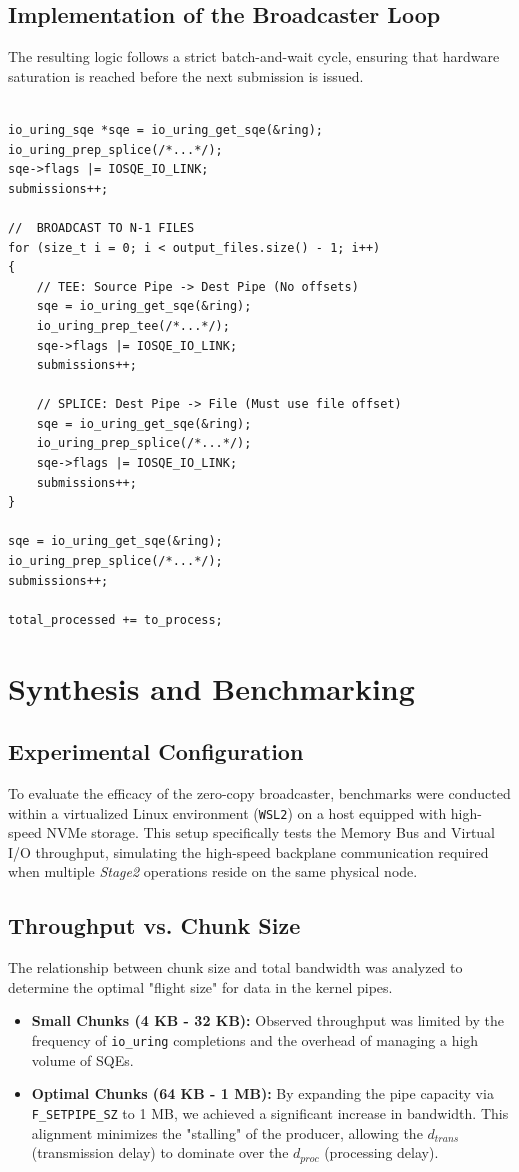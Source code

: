 \documentclass[
	a4paper,
	10pt,
	unnumberedsections,
	twoside, 
]{LTJournalArticle}
\begin{document}
\subsection{Implementation of the Broadcaster Loop}
The resulting logic follows a strict batch-and-wait cycle, ensuring that hardware saturation is reached before the next submission is issued.
\begin{lstlisting}[caption=Optimized Broadcaster Loop Logic]

io_uring_sqe *sqe = io_uring_get_sqe(&ring);
io_uring_prep_splice(/*...*/);
sqe->flags |= IOSQE_IO_LINK;
submissions++;
	
//  BROADCAST TO N-1 FILES
for (size_t i = 0; i < output_files.size() - 1; i++)
{
	// TEE: Source Pipe -> Dest Pipe (No offsets)
	sqe = io_uring_get_sqe(&ring);
	io_uring_prep_tee(/*...*/);
	sqe->flags |= IOSQE_IO_LINK;
	submissions++;
		
	// SPLICE: Dest Pipe -> File (Must use file offset)
	sqe = io_uring_get_sqe(&ring);
	io_uring_prep_splice(/*...*/);
	sqe->flags |= IOSQE_IO_LINK;
	submissions++;
}
	
sqe = io_uring_get_sqe(&ring);
io_uring_prep_splice(/*...*/);
submissions++;
	
total_processed += to_process;
\end{lstlisting}


\section{Synthesis and Benchmarking}
\subsection{Experimental Configuration}
To evaluate the efficacy of the zero-copy broadcaster, benchmarks were conducted within a virtualized Linux environment (\texttt{WSL2}) on a host equipped with high-speed NVMe storage. This setup specifically tests the Memory Bus and Virtual I/O throughput, simulating the high-speed backplane communication required when multiple \textit{Stage2} operations reside on the same physical node.

\subsection{Throughput vs. Chunk Size}
The relationship between chunk size and total bandwidth was analyzed to determine the optimal "flight size" for data in the kernel pipes.
\begin{itemize}
	\item \textbf{Small Chunks (4 KB - 32 KB):} Observed throughput was limited by the frequency of \texttt{io\_uring} completions and the overhead of managing a high volume of SQEs.
	\item \textbf{Optimal Chunks (64 KB - 1 MB):} By expanding the pipe capacity via \texttt{F\_SETPIPE\_SZ} to 1 MB, we achieved a significant increase in bandwidth. This alignment minimizes the "stalling" of the producer, allowing the $d_{trans}$ (transmission delay) to dominate over the $d_{proc}$ (processing delay).
\end{itemize}
\end{document}
